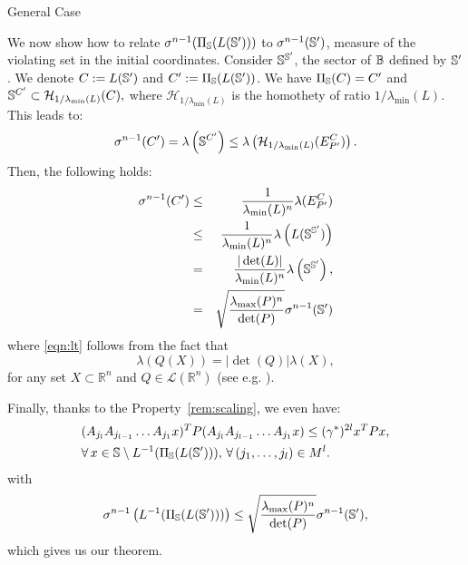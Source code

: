 \begin{subsection}{General Case}
\begin{pf}
We now show how to relate $\sigma^{n-1}(\Pi_{\mathbb{S}}(L(\mathbb{S}')))$ to $\sigma^{n-1}(\mathbb{S}')$, measure of the violating set in the initial coordinates. Consider $\mathbb{S}^{\mathbb{S}'}$, the sector of $\mathbb{B}$ defined by $\mathbb{S}'$. We denote $C:= L(\mathbb{S}')$ and $C':=\Pi_{\mathbb{S}}(L(\mathbb{S}'))$. We have $\Pi_{\mathbb{S}}(C) = C'$ and $\mathbb{S}^{C'} \subset \mathcal{H}_{1/ \lambda_{\min}(L)}(C),$
where $\mathcal{H}_{1/ \lambda_{\min}(L)}$ is the homothety of ratio $1/ \lambda_{\min}(L)$. This leads to:
$$\sigma^{n-1}(C') = \lambda \left( \mathbb{S}^{C'} \right) \leq \lambda \left( \mathcal{H}_{1/ \lambda_{\min}(L)}(E_{P'}^{C}) \right).$$ Then, the following holds: \begin{eqnarray}
\nonumber\sigma^{n-1}(C') &\leq& \frac{1}{\lambda_{\min}(L)^n}\lambda(E_{P'}^{C}) \\
\nonumber &\leq&\frac{1}{\lambda_{\min}(L)^n} \lambda \left( L(\mathbb{S}^{\mathbb{S}'}) \right)\\ 
\label{eqn:lt} &=&\frac{|\det(L)|}{\lambda_{\min}(L)^n}\lambda \left( \mathbb{S}^{\mathbb{S}'} \right),\\
\label{eqn:map1} &=&\sqrt{\frac{\lambda_{\max}(P)^n}{\det(P)}}\sigma^{n-1}(\mathbb{S}')
\end{eqnarray}
where \eqref{eqn:lt} follows from the fact that
$$ \lambda(Q(X)) = |\det(Q)| \lambda(X),$$
for any set $X \subset \mathbb{R}^n$ and $Q \in \mathcal{L}(\mathbb{R}^n)$ (see e.g. \cite{rudin}).

Finally, thanks to the Property~\ref{rem:scaling}, we even have:
\begin{equation}\label{eqn:P1}
\begin{aligned}
& (A_{j_l} A_{j_{l-1}} \dots A_{j_1} x)^T P (A_{j_l} A_{j_{l-1}} \dots A_{j_1} x) \leq (\gamma^*)^{2l} x^T P x, \\ 
& \forall\, x \in \mathbb{S} \setminus L^{-1}(\Pi_{\mathbb{S}}(L(\mathbb{S}'))), \,\forall\, (j_1,\dots,j_l) \in M^l.
\end{aligned}
\end{equation}
with $$\sigma^{n-1} \left( L^{-1} (\Pi_{\mathbb{S}}(L(\mathbb{S}'))) \right) \leq \sqrt{\frac{\lambda_{\max}(P)^n}{\det(P)}}\sigma^{n-1}(\mathbb{S}'), $$ which gives us our theorem.
\end{pf}

\end{subsection}
